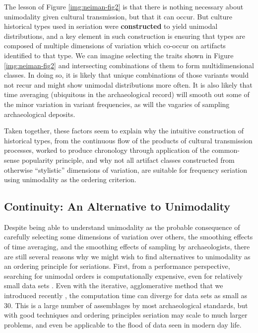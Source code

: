\documentclass[graybox,natbib]{svmult}
\begin{document}
The lesson of Figure \ref{img:neiman-fig2} is that there is nothing
necessary about unimodality given cultural transmission, but that it can
occur. But culture historical types used in seriation were
\textbf{constructed} to yield unimodal distributions, and a key element
in such construction is ensuring that types are composed of multiple
dimensions of variation which co-occur on artifacts identified to that
type. We can imagine selecting the traits shown in Figure
\ref{img:neiman-fig2} and intersecting combinations of them to form
multidimensional classes. In doing so, it is likely that unique
combinations of those variants would not recur and might show unimodal
distributions more often. It is also likely that time averaging
(ubiquitous in the archaeological record) will smooth out some of the
minor variation in variant frequencies, as will the vagaries of sampling
archaeological deposits.

Taken together, these factors seem to explain why the intuitive
construction of historical types, from the continuous flow of the
products of cultural transmission processes, worked to produce
chronology through application of the common-sense popularity principle,
and why not all artifact classes constructed from otherwise
``stylistic'' dimensions of variation, are suitable for frequency
seriation using unimodality as the ordering criterion.

\subsection{Continuity: An Alternative to
Unimodality}\label{continuity-an-alternative-to-unimodality}

Despite being able to understand unimodality as the probable consequence
of carefully selecting some dimensions of variation over others, the
smoothing effects of time averaging, and the smoothing effects of
sampling by archaeologists, there are still several reasons why we might
wish to find alternatives to unimodality as an ordering principle for
seriations. First, from a performance perspective, searching for
unimodal orders is computationally expensive, even for relatively small
data sets \citep{Madsen2014}. Even with the iterative, agglomerative
method that we introduced recently \citep{lipomadsendunnell2015}, the
computation time can diverge for data sets as small as 30. This is a
large number of assemblages by most archaeological standards, but with
good techniques and ordering principles seriation may scale to much
larger problems, and even be applicable to the flood of data seen in
modern day life.
\end{document}

